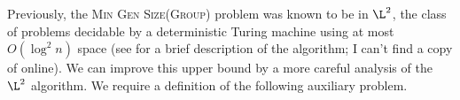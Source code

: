 \documentclass{article}
\newcommand{\gen}[1]{{\langle #1 \rangle}}
\begin{document}






Previously, the \textsc{Min Gen Size(Group)} problem was known to be in $\L^2$, the class of problems decidable by a deterministic Turing machine using at most $O(\log^2 n)$ space \cite{lsz77} (see \cite[Proposition~3]{at06} for a brief description of the algorithm; I can't find a copy of \cite{lsz77} online).
We can improve this upper bound by a more careful analysis of the $\L^2$ algorithm.
We require a definition of the following auxiliary problem.
\end{document}
